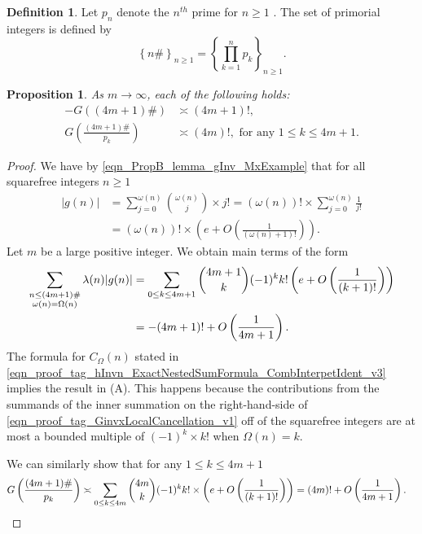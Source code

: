 \documentclass[11pt,reqno,a4letter]{article}
\numberwithin{equation}{section}
\numberwithin{figure}{section}
\numberwithin{table}{section}
\newcommand{\seqnum}[1]{\href{http://oeis.org/#1}{\color{ProcessBlue}{\underline{#1}}}}
\theoremstyle{plain}
\newtheorem{prop}[theorem]{Proposition}
\numberwithin{theorem}{section}
\theoremstyle{definition}
\newtheorem{definition}[theorem]{Definition}
\begin{document}
\begin{definition}
Let $p_n$ denote the $n^{th}$ prime for $n \geq 1$ 
\cite[\seqnum{A000040}]{OEIS}. 
The set of primorial integers is defined by  
\cite[\seqnum{A002110}]{OEIS} 
\[
\left\{n\#\right\}_{n \geq 1} = \left\{\prod_{k=1}^{n} p_k\right\}_{n \geq 1}. 
\]
\end{definition}

\begin{prop}
\label{theorem_PrimorialSeqGInvCalcs_v1} 
As $m \rightarrow \infty$, each of the following holds: 
\begin{align} 
\tag{A} 
-G((4m+1)\#) & \asymp (4m+1)!, \\ 
\tag{B} 
G\left(\frac{(4m+1)\#}{p_k}\right) & \asymp (4m)!, 
     \text{ for any } 1 \leq k \leq 4m+1. 
\end{align} 
\end{prop}
\begin{proof} 
We have by \eqref{eqn_PropB_lemma_gInv_MxExample} 
that for all squarefree integers $n \geq 1$ 
\begin{align*} 
|g(n)| & = \sum_{j=0}^{\omega(n)} \binom{\omega(n)}{j} \times j! 
     = (\omega(n))! \times \sum_{j=0}^{\omega(n)} \frac{1}{j!} \\ 
     & = (\omega(n))! \times \left(e + O\left(\frac{1}{(\omega(n)+1)!}\right)\right). 
\end{align*} 
Let $m$ be a large positive integer. 
We obtain main terms of the form 
\begin{align} 
\label{eqn_proof_tag_GinvxLocalCancellation_v1} 
\sum_{\substack{n \leq (4m+1)\# \\ \omega(n)=\Omega(n)}} \lambda(n) |g(n)| 
     & = \sum_{0 \leq k \leq 4m+1} \binom{4m+1}{k} (-1)^{k} k! 
     \left(e + O\left(\frac{1}{(k+1)!}\right)\right) \\ 
\notag 
     & = -(4m+1)! + O\left(\frac{1}{4m+1}\right). 
\end{align} 
The formula for $C_{\Omega}(n)$ stated in 
\eqref{eqn_proof_tag_hInvn_ExactNestedSumFormula_CombInterpetIdent_v3} 
implies the result in (A). 
This happens because the contributions from the summands of the inner 
summation on the right-hand-side of 
\eqref{eqn_proof_tag_GinvxLocalCancellation_v1} 
off of the squarefree integers 
are at most a bounded multiple of $(-1)^k \times k!$ when $\Omega(n) = k$. 

We can similarly show that for any $1 \leq k \leq 4m+1$ 
\begin{align*}
G\left(\frac{(4m+1)\#}{p_k}\right) & \asymp \sum_{0 \leq k \leq 4m} \binom{4m}{k} (-1)^{k} k! 
     \times \left(e + O\left(\frac{1}{(k+1)!}\right)\right) = (4m)! + O\left(\frac{1}{4m+1}\right). 
     \qedhere 
\end{align*}
\end{proof}
\end{document}
